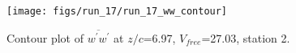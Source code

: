 \begin{figure}[H]
\centering
\texttt{[image: figs/run\_17/run\_17\_ww\_contour]}
\caption{Contour plot of $\overline{w^\prime w^\prime}$ at $z/c$=6.97, $V_{free}$=27.03, station 2.}
\label{fig:run_17_ww_contour}
\end{figure}


